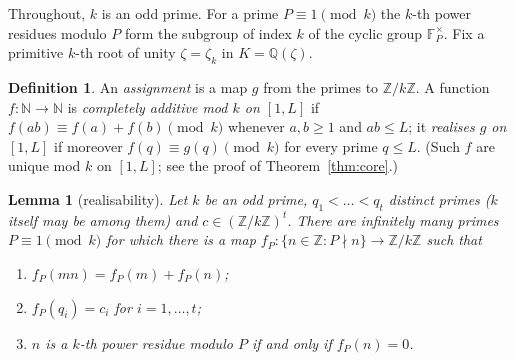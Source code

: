 \documentclass[11pt]{article}
\numberwithin{equation}{section}
\newtheorem{lemma}[theorem]{Lemma}
\theoremstyle{definition}
\newtheorem{definition}[theorem]{Definition}
\theoremstyle{remark}
\newcommand{\Q}{\mathbb Q}
\newcommand{\Z}{\mathbb Z}
\newcommand{\N}{\mathbb N}
\newcommand{\F}{\mathbb F}
\begin{document}
Throughout, $k$ is an odd prime. For a prime $P\equiv1\pmod k$ the $k$-th power residues modulo $P$ form
the subgroup of index $k$ of the cyclic group $\F_P^\times$. Fix a primitive $k$-th root of unity
$\zeta=\zeta_k$ in $K=\Q(\zeta)$.

\begin{definition}
An \emph{assignment} is a map $g$ from the primes to $\Z/k\Z$. A function $f:\N\to\N$ is
\emph{completely additive mod $k$ on $[1,L]$} if $f(ab)\equiv f(a)+f(b)\pmod k$ whenever $a,b\ge1$ and
$ab\le L$; it \emph{realises $g$ on $[1,L]$} if moreover $f(q)\equiv g(q)\pmod k$ for every prime
$q\le L$. (Such $f$ are unique mod $k$ on $[1,L]$; see the proof of Theorem~\ref{thm:core}.)
\end{definition}

\begin{lemma}[realisability]\label{lem:real}
Let $k$ be an odd prime, $q_1<\dots<q_t$ distinct primes ($k$ itself may be among them) and
$c\in(\Z/k\Z)^t$. There are infinitely many primes $P\equiv1\pmod k$ for which there is a map
$f_P:\{n\in\Z: P\nmid n\}\to\Z/k\Z$ such that
\begin{enumerate}
\item $f_P(mn)=f_P(m)+f_P(n)$;
\item $f_P(q_i)=c_i$ for $i=1,\dots,t$;
\item $n$ is a $k$-th power residue modulo $P$ if and only if $f_P(n)=0$.
\end{enumerate}
\end{lemma}
\end{document}
